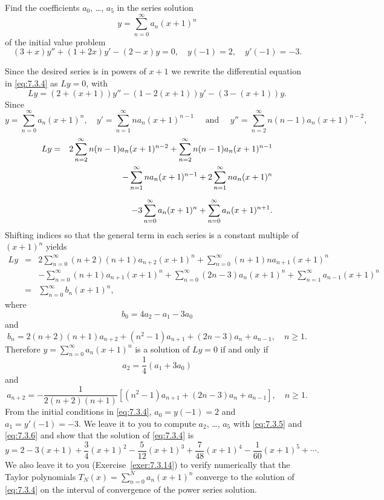 \begin{example}
  \label{example:7.3.2} \rm Find the coefficients $a_{0}$, \dots, $a_{5}$ in the series solution
  \[
    y=\sum^{\infty}_{n=0}a_{n}(x+1)^{n}
  \]
  of the initial value problem
  \begin{equation}
    \label{eq:7.3.4}(3+x)y''+(1+2x)y'-(2-x)y=0,\quad y(-1)=2,\quad y'(-1)=-3.
  \end{equation}
\end{example}

\begin{examplesolution}
\solution Since the desired series is in powers of $x+1$ we rewrite the differential equation in
\eqref{eq:7.3.4} as $Ly=0$, with
\[
  Ly=\left(2+(x+1)\right)y''-\left(1-2(x+1)\right)y'-\left(3-(x+1)\right)y.
\]
Since
\[
  y=\sum^{\infty}_{n=0}a_{n}(x+1)^{n},\quad y'=\sum^{\infty}_{n=1}n a_{n}(x+1)^{n-1}\quad\mbox{ and }\quad y''=\sum^{\infty}_{n=2}n(n-1)a_{n}(x+1)^{n-2},
\]
\begin{eqnarray*}
  Ly & = & 2\sum^{\infty}_{n=2}n(n-1)a_{n}(x+1)^{n-2}+\sum^{\infty}_{n=2}n(n-1)a_{n}(x+1)^{n-1} \\
     &   & -\sum^{\infty}_{n=1}na_{n}(x+1)^{n-1}+2\sum^{\infty}_{n=1}na_{n}(x+1)^{n}            \\[2\jot]
     &   & -3\sum^{\infty}_{n=0}a_{n}(x+1)^{n}+\sum_{n=0}^{\infty}a_{n}(x+1)^{n+1}.
\end{eqnarray*}
Shifting indices so that the general term in each series is a constant multiple of $(x+1)^{n}$
yields
\begin{eqnarray*}
  Ly & = & 2\sum^{\infty}_{n=0}(n+2)(n+1)a_{n+2}(x+1)^{n}+\sum^{\infty}_{n=0}(n+1)na_{n+1}(x+1)^{n}                              \\[10pt]
     &   & -\sum^{\infty}_{n=0}(n+1)a_{n+1}(x+1)^{n}+\sum^{\infty}_{n=0}(2n-3)a_{n}(x+1)^{n}+\sum^{\infty}_{n=1}a_{n-1}(x+1)^{n} \\[10pt]
     & = & \sum^{\infty}_{n=0}b_{n}(x+1)^{n},
\end{eqnarray*}
where
\[
  b_{0}=4a_{2}-a_{1}-3a_{0}
\]
and
\[
  b_{n}=2(n+2)(n+1)a_{n+2}+(n^{2}-1)a_{n+1}+(2n-3)a_{n}+a_{n-1},\quad n\ge1.
\]
Therefore $y=\sum^{\infty}_{n=0}a_{n}(x+1)^{n}$ is a solution of $Ly=0$ if and only if
\begin{equation}
  \label{eq:7.3.5}a_{2}=\frac{1}{4}(a_{1}+3a_{0})
\end{equation}
and
\begin{equation}
  \label{eq:7.3.6}a_{n+2}=-\frac{1}{2(n+2)(n+1)}\left[(n^{2}-1)a_{n+1}+(2n-3)a_{n}+a_{n-1}\right], \quad n\ge1.
\end{equation}
From the initial conditions in \eqref{eq:7.3.4}, $a_{0}=y(-1)=2$ and $a_{1}=y'(-1)=-3$. We leave it
to you to compute $a_{2}$, \dots, $a_{5}$ with \eqref{eq:7.3.5} and \eqref{eq:7.3.6} and show that
the solution of \eqref{eq:7.3.4} is
\[
  y=2-3(x+1)+\frac{3}{4}(x+1)^{2}-\frac{5}{12}(x+1)^{3}+\frac{7}{48}(x+1)^{4}-\frac{1}{60}(x+1)^{5}+\cdots.
\]
We also leave it to you (Exercise~\ref{exer:7.3.14}) to verify numerically that the Taylor
polynomials $T_{N}(x)=\sum_{n=0}^{N}a_{n}(x+1)^{n}$ converge to the solution of \eqref{eq:7.3.4} on the
interval of convergence of the power series solution.
\end{examplesolution}

